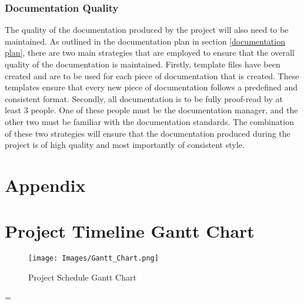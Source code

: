 \documentclass{article}
\newenvironment{absolutelynopagebreak}
  {\par\nobreak\vfil\penalty0\vfilneg
   \vtop\bgroup}
  {\par\xdef\tpd{\the\prevdepth}\egroup
   \prevdepth=\tpd}
\begin{document}
\begin{adjustwidth}{1em}{0pt}
\subsubsection{Documentation Quality}
\begin{adjustwidth}{1em}{0pt}
The quality of the documentation produced by the project will also need to be maintained. As outlined in the documentation plan in section \ref{documentation plan}, there are two main strategies that are employed to ensure that the overall quality of the documentation is maintained. Firstly, template files have been created and are to be used for each piece of documentation that is created. These templates ensure that every new piece of documentation follows a predefined and consistent format. Secondly, all documentation is to be fully proof-read by at least 3 people. One of these people must be the documentation manager, and the other two must be familiar with the documentation standards. The combination of these two strategies will ensure that the documentation produced during the project is of high quality and most importantly of consistent style.
\end{adjustwidth}
\end{adjustwidth}
\pagebreak

\begin{absolutelynopagebreak}
  \section{Appendix}
  \appendix
  \section{Project Timeline Gantt Chart} \label{appendix:gantt_chart}
  \vspace{-9em}
  \begin{sidewaysfigure}[H]
  	\texttt{[image: Images/Gantt\_Chart.png]}
    \caption{Project Schedule Gantt Chart}
    \label{fig:gantt_chart}
  \end{sidewaysfigure}
\end{absolutelynopagebreak}
\end{document}
